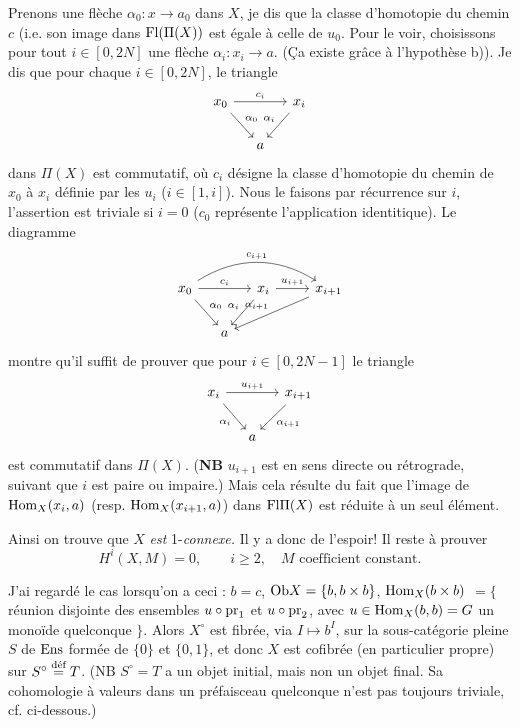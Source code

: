 Prenons une flèche $\alpha_0 : x\longrightarrow a_0$ dans $X$, je dis que la %
classe d'homotopie du chemin $c$ (i.e. son image dans $\Fl(\Pi(X))$ est égale à celle de $u_0$. %
Pour le voir, choisissons pour tout $i\in[0,2N]$ une flèche $\alpha_i : x_i\longrightarrow a$. (Ça existe grâce à l'hypothèse b)). Je dis que pour chaque $i\in[0,2N]$, le triangle
\[
\begin{tikzcd}[column sep=small]
x_0 \arrow[rr, "c_i"] \arrow[dr, "\alpha_0"] & & x_i \arrow[dl, "\alpha_i"'] \\
& a &
\end{tikzcd}
\]
dans $\Pi(X)$ est commutatif, où $c_i$ désigne la classe d'homotopie du chemin de $x_0$ à $x_i$ définie par les $u_i$ ($i\in[1,i]$). Nous le faisons par récurrence sur $i$, l'assertion est triviale si $i = 0$ ($c_0$ représente l'application identitique). Le diagramme %
\[
\begin{tikzcd}[column sep=small]
x_0 \arrow[rr, "c_i"] \arrow[dr, "\alpha_0"] \arrow[rrrr, bend left=32, "c_{i+1}"] & & x_i \arrow[dl, "\alpha_i"'] \arrow[rr, "u_{i+1}"] & & x_{i+1} \arrow[dlll, "\alpha_{i+1}"'] \\ %
& a & & &
\end{tikzcd}
\]
montre qu'il suffit de prouver que pour $i\in[0,2N-1]$ le triangle
\[
\begin{tikzcd}[column sep=small]
x_i \arrow[rr, "u_{i+1}"] \arrow[dr, "\alpha_i"'] & & x_{i+1} \arrow[dl, "\alpha_{i+1}"] \\
& a &
\end{tikzcd}
\]
est commutatif dans $\Pi(X)$. (\textbf{NB} $u_{i+1}$ est en sens directe ou rétrograde, suivant que %
$i$ est paire ou impaire.) Mais cela résulte du fait que l'image de $\Hom_X(x_i,a)$ (resp. $\Hom_X(x_{i+1},a)$) %
dans $\Fl\Pi(X)$ est réduite à un seul élément.

Ainsi on trouve que $X$ \textit{est} 1-\textit{connexe.} Il y a donc de l'espoir! Il reste à prouver
\[
H^i(X,M) = 0, \qquad i\geq 2, \quad M \text{ coefficient constant.}
\]

J'ai regardé le cas lorsqu'on a ceci : $b = c$, $\Ob X = \{b, b\times b\}$, $\Hom_X(b\times b)$ $= \{$ réunion disjointe des ensembles $u\circ\pr_1$ et $u\circ\pr_2$, avec $u\in\Hom_X(b,b) = G$ un monoïde quelconque $\}$. Alors $X^\circ$ est fibrée, via $I\longmapsto b^I$, sur la sous-catégorie pleine $S$ de $\Ens$ formée de $\{0\}$ et $\{0,1\}$, et donc $X$ est cofibrée (en particulier propre) sur $S^\circ \deq T$. (NB $S^\circ = T$ a un objet initial, mais non un objet final. Sa cohomologie à valeurs dans un préfaisceau quelconque n'est pas toujours triviale, cf. ci-dessous.)

